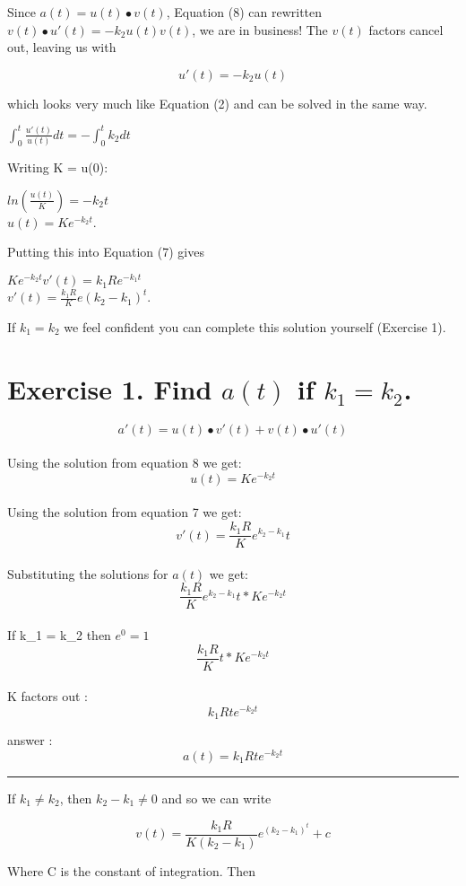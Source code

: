 \documentclass[]{article}
\begin{document}
Since \(a(t) = u(t) \bullet v(t)\), Equation (8) can rewritten
\(v(t) \bullet u'(t) = -k_2u(t)v(t)\), we are in business! The \(v(t)\)
factors cancel out, leaving us with

\[u'(t) = -k_2u(t)\]

which looks very much like Equation (2) and can be solved in the same
way.

\(\int_0^t \frac{u'(t)}{u(t)} dt = -\int_0^t k_2dt\)

Writing K = u(0):

\(ln (\frac{u(t)}{K}) = -k_2t\)\\
\(u(t) = Ke^{-k_2t}\).

Putting this into Equation (7) gives

\(Ke^{-k_2t}v'(t) = k_1Re^{-k_1t}\)\\
\(v'(t) = \frac{k_1R}{K}e(k_2-k_1)^t\).

If \(k_1 = k_2\) we feel confident you can complete this solution
yourself (Exercise 1).

\section{\texorpdfstring{Exercise 1. Find \(a(t)\) if
\(k_1 = k_2\).}{Exercise 1. Find a(t) if k\_1 = k\_2.}}\label{exercise-1.-find-at-if-k_1-k_2.}

\[a'(t) = u(t) \bullet v'(t) + v(t) \bullet u'(t)\]\\
Using the solution from equation 8 we get: \[u(t) = Ke^{-k_2t}\]\\
Using the solution from equation 7 we get:
\[v'(t) = \frac{k_1R}{K}e^{k_2 - k_1}t\]\\
Substituting the solutions for \(a(t)\) we get:
\[\frac{k_1R}{K}e^{k_2 - k_1}t * Ke^{-k_2t}\]\\
If k\_1 = k\_2 then \(e^{0} = 1\)\\
\[\frac{k_1R}{K}t * Ke^{-k_2t}\]\\
K factors out : \[k_1Rte^{-k_2t}\]

answer : \[a(t) = k_1Rte^{-k_2t}\]

\begin{center}\rule{0.5\linewidth}{\linethickness}\end{center}

If \(k_1 \neq k_2\), then \(k_2 - k _1 \neq 0\) and so we can write

\[v(t) = \frac{k_1R}{K(k_2 - k_1)}e^(k_2 -k_1)^t +c\]

Where C is the constant of integration. Then
\end{document}
